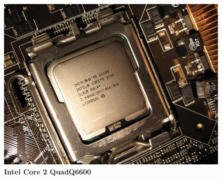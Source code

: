 \begin{figure}[htb]
	\centering
	\includegraphics[scale = 0.8]{Graphics/IntelCore_2_Q6600.jpeg}
	\caption{\textbf{Intel Core 2 QuadQ6600}}
	\label{fig:24}
\end{figure}
\newpage

